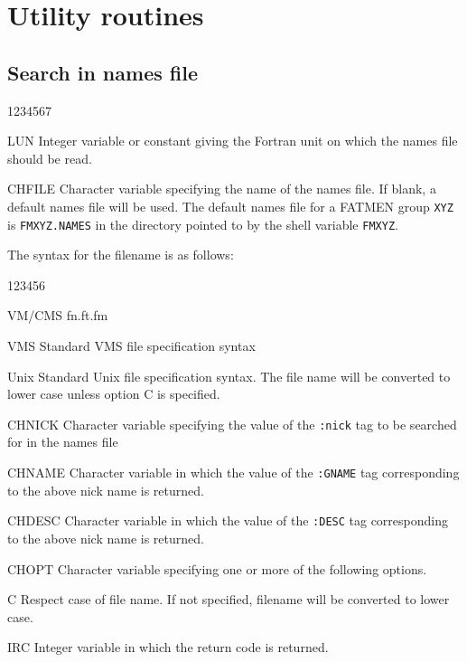 \section{Utility routines}

\subsection{Search in names file}
\begin{DLtt}{1234567}
\item[LUN]
Integer variable or constant giving the Fortran unit on which
the names file should be read.
\item[CHFILE]
Character variable specifying the name of the names file.
If blank, a default names file will be used. The default
names file for a FATMEN group {\tt XYZ} is {\tt FMXYZ.NAMES}
in the directory pointed to by the shell variable {\tt FMXYZ}.

The syntax for the filename is as follows:

\begin{DLtt}{123456}
\item[VM/CMS]fn.ft.fm
\item[VMS]Standard VMS file specification syntax
\item[Unix]Standard Unix file specification syntax. The file name
will be converted to lower case unless option C is specified.
\end{DLtt}

\item[CHNICK]
Character variable specifying the value of the {\tt :nick} tag
to be searched for in the names file
\item[CHNAME]
Character variable in which the value of the {\tt :GNAME} tag
corresponding to the above nick name is returned.
\item[CHDESC]
Character variable in which the value of the {\tt :DESC} tag
corresponding to the above nick name is returned.
\item[CHOPT]
Character variable specifying one or more of the following options.
\begin{DLtt}{12}
\item[C]Respect case of file name. If not specified, filename will
be converted to lower case.
\end{DLtt}
\item[IRC]
Integer variable in which the return code is returned.
\end{DLtt}

